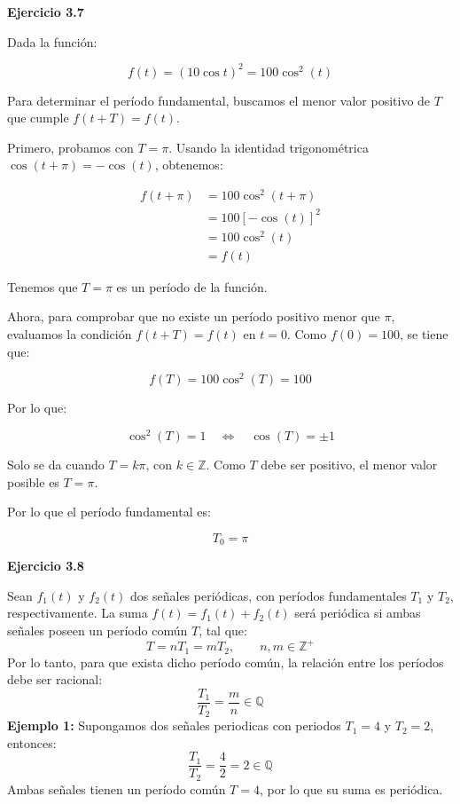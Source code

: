 \documentclass[11pt,a4paper]{article}
\begin{document}
\vspace{0.3cm}

\noindent\textbf{Ejercicio 3.7}\par

Dada la función:

\[
f(t)=(10\cos t)^2=100\cos^2(t)
\]

Para determinar el período fundamental, buscamos el menor valor positivo de \(T\) que cumple \(f(t+T)=f(t)\).

Primero, probamos con \(T=\pi\). Usando la identidad trigonométrica
\(\cos(t+\pi)=-\cos(t)\), obtenemos:

\[
\begin{aligned}
f(t+\pi)
&=100\cos^2(t+\pi)\\
&=100[-\cos(t)]^2\\
&=100\cos^2(t)\\
&=f(t)
\end{aligned}
\]

Tenemos que \(T=\pi\) es un período de la función.

Ahora, para comprobar que no existe un período positivo menor que \(\pi\), evaluamos la condición \(f(t+T)=f(t)\) en \(t=0\). Como \(f(0)=100\), se tiene que:

\[
f(T)=100\cos^2(T)=100
\]

Por lo que:

\[
\cos^2(T)=1 \quad\Longleftrightarrow\quad \cos(T)=\pm1
\]

Solo se da cuando \(T=k\pi\), con \(k\in\mathbb{Z}\). Como \(T\) debe ser positivo, el menor valor posible es \(T=\pi\).

Por lo que el período fundamental es:

\[
\boxed{T_0=\pi}
\]

\vspace{0.3cm}
\noindent\textbf{Ejercicio 3.8}\par
Sean $f_1(t)$ y $f_2(t)$ dos señales periódicas, con períodos fundamentales $T_1$ y $T_2$, respectivamente. La suma $f(t)=f_1(t)+f_2(t)$ será periódica si ambas señales poseen un período común $T$, tal que:
\[
  T=nT_1=mT_2,\qquad n,m\in\mathbb{Z}^+
\]
Por lo tanto, para que exista dicho período común, la relación entre los períodos debe ser racional:
\[
  \frac{T_1}{T_2}=\frac{m}{n}\in\mathbb{Q}
\]
\textbf{Ejemplo 1:} Supongamos dos señales periodicas con periodos $T_1=4$ y $T_2=2$, entonces:
\[
  \frac{T_1}{T_2}=\frac{4}{2}=2\in\mathbb{Q}
\]
Ambas señales tienen un período común $T=4$, por lo que su suma es periódica.
\end{document}
